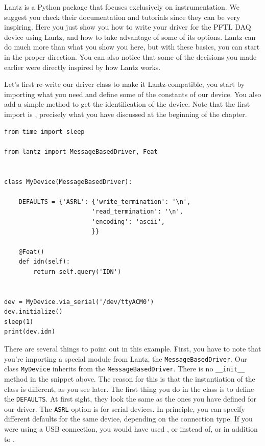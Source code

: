 Lantz is a Python package that focuses exclusively on instrumentation. We suggest you check their documentation and tutorials since they can be very inspiring. Here you just show you how to write your driver for the {PFTL DAQ} device using Lantz, and how to take advantage of some of its options. Lantz can do much more than what you show you here, but with these basics, you can start in the proper direction. You can also notice that some of the decisions you made earlier were directly inspired by how Lantz works.

Let's first re-write our driver class to make it Lantz-compatible, you start by importing what you need and define some of the constants of our device. You also add a simple method to get the identification of the device. Note that the first import is , precisely what you have discussed at the beginning of the chapter.

\begin{verbatim}
from time import sleep

from lantz import MessageBasedDriver, Feat


class MyDevice(MessageBasedDriver):

    DEFAULTS = {'ASRL': {'write_termination': '\n',
                        'read_termination': '\n',
                        'encoding': 'ascii',
                        }}

    @Feat()
    def idn(self):
        return self.query('IDN')


dev = MyDevice.via_serial('/dev/ttyACM0')
dev.initialize()
sleep(1)
print(dev.idn)
\end{verbatim}

There are several things to point out in this example. First, you have to note that you're importing a special module from Lantz, the \texttt{MessageBasedDriver}. Our class \texttt{MyDevice} inherits from the \texttt{MessageBasedDriver}. There is no \texttt{__init__} method in the snippet above. The reason for this is that the instantiation of the class is different, as you see later. The first thing you do in the class is to define the \texttt{DEFAULTS}. At first sight, they look the same as the ones you have defined for our driver. The \texttt{ASRL} option is for serial devices. In principle, you can specify different defaults for the same device, depending on the connection type. If you were using a {USB} connection, you would have used , or  instead of, or in addition to .

